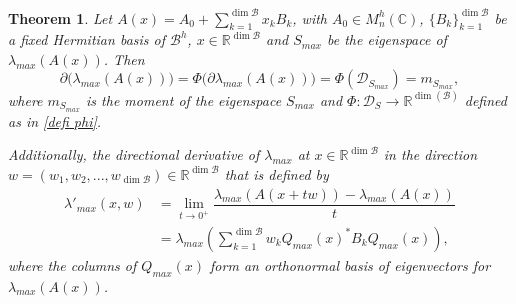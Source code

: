 \documentclass[12pt,a4paper]{article}
\def\calB{\mathcal B}
\def\calD{\mathcal D}
\def\R{\mathbb R}
\def\C{\mathbb C}
\newtheorem{theorem}{Theorem}
\numberwithin{equation}{section}
\begin{document}
\begin{theorem}\label{teo subdif=ms}
Let $A(x)=A_0+\sum_{k=1}^{\dim{\calB}}x_kB_k$, with $A_0\in  M_n^{h}(\C)$, $\{B_k\}_{k=1}^{\dim{\calB}}$ be a fixed Hermitian basis of $\mathcal{B}^h$, $x\in \R^{\dim{\calB}}$ and $S_{max}$ be the eigenspace of $\lambda_{max}(A(x))$. Then
\begin{equation}\label{subdiff l1 = momento}
			\partial\big(\lambda_{max}(A(x))\big)=\Phi\big(\partial\lambda_{max}(A(x))\big)=\Phi(\mathcal{D}_{S_{max}})= m_{S_{max}},
\end{equation}
where $m_{S_{max}}$ is the moment of the eigenspace $S_{max}$ and $\Phi:\calD_{S}\to\R^{\dim(\calB)}$ defined as in \eqref{defi phi}.	

Additionally, the directional derivative of $\lambda_{max}$ at $x\in \R^{\dim{\calB}}$ in the direction $w=(w_1,w_2,...,w_{\dim{\calB}})\in \R^{\dim{\calB}}$ that is defined by
\begin{equation} \label{partial der}
	\begin{split}
\lambda'_{max}(x,w)&=\lim\limits_{t\to 0^+}\dfrac{\lambda_{max}(A(x+tw))-\lambda_{max}(A(x))}{t}\\
&= \lambda_{max}\left(\sum_{k=1}^{\dim{\calB}}w_kQ_{max}(x)^*B_kQ_{max}(x) \right),
\end{split}
\end{equation}
where the columns of $Q_{max}(x)$ form an orthonormal basis of eigenvectors for $\lambda_{max}(A(x))$.
\end{theorem}
\end{document}

